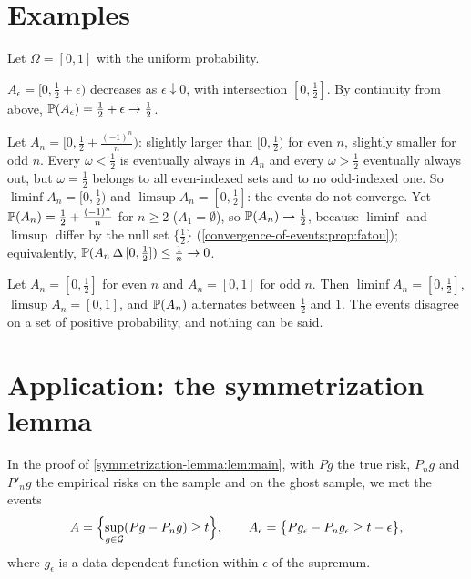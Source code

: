 \begin{notechapter}
\section{Examples}\label{convergence-of-events:sec:examples}

Let $\Omega = [0,1]$ with the uniform probability.

\begin{example}
$A_\epsilon = [0,\frac12 + \epsilon)$ decreases as $\epsilon\downarrow0$, with
intersection $[0,\frac12]$. By continuity from above,
$\mathbb{P}(A_\epsilon) = \frac12 + \epsilon\to\frac12$.
\end{example}

\begin{example}\label{convergence-of-events:ex:oscillate}
Let $A_n = [0,\frac12 + \frac{(-1)^n}{n})$: slightly larger than $[0,\frac12)$
for even $n$, slightly smaller for odd $n$. Every $\omega<\frac12$ is eventually
always in $A_n$ and every $\omega>\frac12$ eventually always out, but
$\omega = \frac12$ belongs to all even-indexed sets and to no odd-indexed one. So
$\liminf A_n = [0,\frac12)$ and $\limsup A_n = [0,\frac12]$: the events do not
converge. Yet $\mathbb{P}(A_n) = \frac12 + \frac{(-1)^n}{n}$ for $n\geq2$ ($A_1 = \emptyset$), so
$\mathbb{P}(A_n)\to\frac12$, because
$\liminf$ and $\limsup$ differ by the null set $\{\frac12\}$
(\cref{convergence-of-events:prop:fatou}); equivalently,
$\mathbb{P}(A_n\,\Delta\,[0,\frac12])\leq\frac1n\to0$.
\end{example}

\begin{example}
Let $A_n = [0,\frac12]$ for even $n$ and $A_n = [0,1]$ for odd $n$. Then
$\liminf A_n = [0,\frac12]$, $\limsup A_n = [0,1]$, and $\mathbb{P}(A_n)$ alternates
between $\frac12$ and $1$. The events disagree on a set of positive
probability, and nothing can be said.
\end{example}

\section{Application: the symmetrization lemma}\label{convergence-of-events:sec:symmetrization}

In the proof of \cref{symmetrization-lemma:lem:main}, with $Pg$ the true risk,
$P_ng$ and $P'_ng$ the empirical risks on the sample and on the ghost sample,
we met the events
\[
  A = \Bigl\{\sup_{g\in\mathcal G}(Pg - P_ng)\geq t\Bigr\},
  \qquad
  A_\epsilon = \bigl\{Pg_\epsilon - P_ng_\epsilon\geq t-\epsilon\bigr\},
\]
where $g_\epsilon$ is a data-dependent function within $\epsilon$ of the
supremum.


\end{notechapter}
